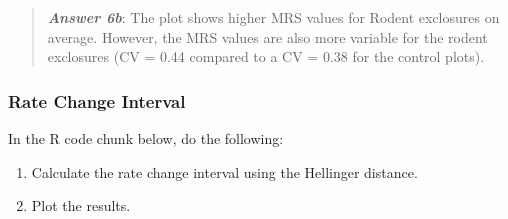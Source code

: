 \documentclass[]{article}
\providecommand{\tightlist}{%
  \setlength{\itemsep}{0pt}\setlength{\parskip}{0pt}}
\begin{document}
\begin{quote}
\textbf{\emph{Answer 6b}}: The plot shows higher MRS values for Rodent
exclosures on average. However, the MRS values are also more variable
for the rodent exclosures (CV = 0.44 compared to a CV = 0.38 for the
control plots).
\end{quote}

\subsubsection{Rate Change Interval}\label{rate-change-interval}

In the R code chunk below, do the following:

\begin{enumerate}
\def\labelenumi{\arabic{enumi}.}
\tightlist
\item
  Calculate the rate change interval using the Hellinger distance.
\item
  Plot the results.
\end{enumerate}
\end{document}
